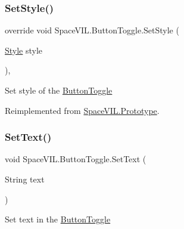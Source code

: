 \subsubsection{\texorpdfstring{Set\+Style()}{SetStyle()}}
{\footnotesize\ttfamily override void Space\+V\+I\+L.\+Button\+Toggle.\+Set\+Style (\begin{DoxyParamCaption}\item[{\mbox{\hyperlink{class_space_v_i_l_1_1_decorations_1_1_style}{Style}}}]{style }\end{DoxyParamCaption})\hspace{0.3cm}{\ttfamily [inline]}, {\ttfamily [virtual]}}



Set style of the \mbox{\hyperlink{class_space_v_i_l_1_1_button_toggle}{Button\+Toggle}} 



Reimplemented from \mbox{\hyperlink{class_space_v_i_l_1_1_prototype_ae96644a6ace490afb376fb542161e541}{Space\+V\+I\+L.\+Prototype}}.

\mbox{\label{class_space_v_i_l_1_1_button_toggle_ac931c391826bc511674985903c87149b}} 
\subsubsection{\texorpdfstring{Set\+Text()}{SetText()}}
{\footnotesize\ttfamily void Space\+V\+I\+L.\+Button\+Toggle.\+Set\+Text (\begin{DoxyParamCaption}\item[{String}]{text }\end{DoxyParamCaption})\hspace{0.3cm}{\ttfamily [inline]}}



Set text in the \mbox{\hyperlink{class_space_v_i_l_1_1_button_toggle}{Button\+Toggle}} 

\mbox{\label{class_space_v_i_l_1_1_button_toggle_afdb8b34251a59d1268bdc23d91c4ee2b}} 
